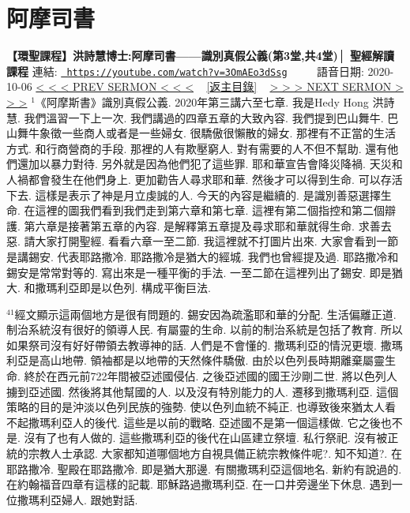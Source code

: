 \documentclass{book}
\begin{document}
\section{阿摩司書}
\label{sec:3OmAEo3dSsg}
\textbf{【環聖課程】洪詩慧博士:阿摩司書——識別真假公義(第3堂,共4堂)│ 聖經解讀課程}
\newline
\newline
連結: \href{https://youtube.com/watch?v=3OmAEo3dSsg}{\texttt{ https://youtube.com/watch?v=3OmAEo3dSsg}} ~~~~ 語音日期: 2020-10-06 
\newline
\newline
\hyperref[sec:g1wzcqEF6WA]{\small{< < < PREV SERMON < < <}}
~
\hyperref[sec:index]{\small{[返主目錄]}}
~
\hyperref[sec:s7QrDPLqvfM]{\small{> > > NEXT SERMON > > >}}
\newline
\newline
$^{1}$《阿摩斯書》識別真假公義.
2020年第三講六至七章.
我是Hedy Hong 洪詩慧.
我們溫習一下上一次.
我們講過的四章五章的大致內容.
我們提到巴山舞牛.
巴山舞牛象徵一些商人或者是一些婦女.
很驕傲很懶散的婦女.
那裡有不正當的生活方式.
和行商營商的手段.
那裡的人有欺壓窮人.
對有需要的人不但不幫助.
還有他們還加以暴力對待.
另外就是因為他們犯了這些罪.
耶和華宣告會降災降禍.
天災和人禍都會發生在他們身上.
更加勸告人尋求耶和華.
然後才可以得到生命.
可以存活下去.
這樣是表示了神是月立虔誠的人.
今天的內容是繼續的.
是識別善惡選擇生命.
在這裡的圖我們看到我們走到第六章和第七章.
這裡有第二個指控和第二個辯護.
第六章是接著第五章的內容.
是解釋第五章提及尋求耶和華就得生命.
求善去惡.
請大家打開聖經.
看看六章一至二節.
我這裡就不打圖片出來.
大家會看到一節是講錫安.
代表耶路撒冷.
耶路撒冷是猶大的經城.
我們也曾經提及過.
耶路撒冷和錫安是常常對等的.
寫出來是一種平衡的手法.
一至二節在這裡列出了錫安.
即是猶大.
和撒瑪利亞即是以色列.
構成平衡巨法.

$^{41}$經文顯示這兩個地方是很有問題的.
錫安因為疏濫耶和華的分配.
生活偏離正道.
制治系統沒有很好的領導人民.
有屬靈的生命.
以前的制治系統是包括了教育.
所以如果祭司沒有好好帶領去教導神的話.
人們是不會懂的.
撒瑪利亞的情況更壞.
撒瑪利亞是高山地帶.
領袖都是以地帶的天然條件驕傲.
由於以色列長時期離棄屬靈生命.
終於在西元前722年間被亞述國侵佔.
之後亞述國的國王沙剛二世.
將以色列人擄到亞述國.
然後將其他幫國的人.
以及沒有特別能力的人.
遷移到撒瑪利亞.
這個策略的目的是沖淡以色列民族的強勢.
使以色列血統不純正.
也導致後來猶太人看不起撒瑪利亞人的後代.
這些是以前的戰略.
亞述國不是第一個這樣做.
它之後也不是.
沒有了也有人做的.
這些撒瑪利亞的後代在山區建立祭壇.
私行祭祀.
沒有被正統的宗教人士承認.
大家都知道哪個地方自視具備正統宗教條件呢?.
知不知道?.
在耶路撒冷.
聖殿在耶路撒冷.
即是猶大那邊.
有關撒瑪利亞這個地名.
新約有說過的.
在約翰福音四章有這樣的記載.
耶穌路過撒瑪利亞.
在一口井旁邊坐下休息.
遇到一位撒瑪利亞婦人.
跟她對話.
\end{document}
